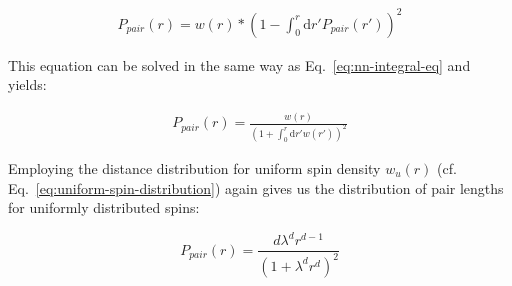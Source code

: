 \begin{align}\label{eq:pair-integral-eq}
	P_{pair}(r) = w(r)*\left(1-\int_0^r \mathrm{d}r' P_{pair}(r')\right)^2
\end{align}

%

This equation can be solved in the same way as Eq.~\ref{eq:nn-integral-eq} and yields:

\begin{align}\label{eq:pair-distribution}
	P_{pair}(r) = \frac{w(r)}{\left(1+\int_0^r\!\mathrm{d}r' w(r')\right)^2}
\end{align}


Employing the distance distribution for uniform spin density $w_u(r)$ (cf. Eq.~\ref{eq:uniform-spin-distribution}) again gives us the distribution of pair lengths for uniformly distributed spins:

\begin{equation}\label{eq:log-logistic-distribution}
	P_{pair}(r) = \frac{d\lambda^d r^{d-1}}{\left(1 + \lambda^d r^d\right)^2 }
\end{equation}


